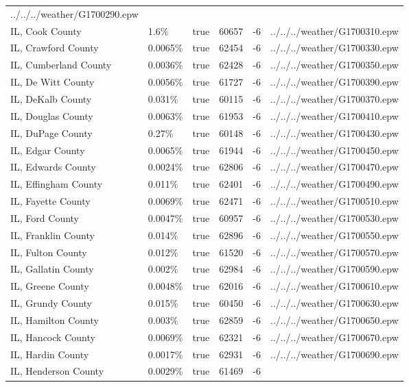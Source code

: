 \begin{longtable}[]{@{}llllll@{}}
../../../weather/G1700290.epw \\
IL, Cook County & 1.6\% & true & 60657 & -6 &
../../../weather/G1700310.epw \\
IL, Crawford County & 0.0065\% & true & 62454 & -6 &
../../../weather/G1700330.epw \\
IL, Cumberland County & 0.0036\% & true & 62428 & -6 &
../../../weather/G1700350.epw \\
IL, De Witt County & 0.0056\% & true & 61727 & -6 &
../../../weather/G1700390.epw \\
IL, DeKalb County & 0.031\% & true & 60115 & -6 &
../../../weather/G1700370.epw \\
IL, Douglas County & 0.0063\% & true & 61953 & -6 &
../../../weather/G1700410.epw \\
IL, DuPage County & 0.27\% & true & 60148 & -6 &
../../../weather/G1700430.epw \\
IL, Edgar County & 0.0065\% & true & 61944 & -6 &
../../../weather/G1700450.epw \\
IL, Edwards County & 0.0024\% & true & 62806 & -6 &
../../../weather/G1700470.epw \\
IL, Effingham County & 0.011\% & true & 62401 & -6 &
../../../weather/G1700490.epw \\
IL, Fayette County & 0.0069\% & true & 62471 & -6 &
../../../weather/G1700510.epw \\
IL, Ford County & 0.0047\% & true & 60957 & -6 &
../../../weather/G1700530.epw \\
IL, Franklin County & 0.014\% & true & 62896 & -6 &
../../../weather/G1700550.epw \\
IL, Fulton County & 0.012\% & true & 61520 & -6 &
../../../weather/G1700570.epw \\
IL, Gallatin County & 0.002\% & true & 62984 & -6 &
../../../weather/G1700590.epw \\
IL, Greene County & 0.0048\% & true & 62016 & -6 &
../../../weather/G1700610.epw \\
IL, Grundy County & 0.015\% & true & 60450 & -6 &
../../../weather/G1700630.epw \\
IL, Hamilton County & 0.003\% & true & 62859 & -6 &
../../../weather/G1700650.epw \\
IL, Hancock County & 0.0069\% & true & 62321 & -6 &
../../../weather/G1700670.epw \\
IL, Hardin County & 0.0017\% & true & 62931 & -6 &
../../../weather/G1700690.epw \\
IL, Henderson County & 0.0029\% & true & 61469 & -6 &

\end{longtable}
